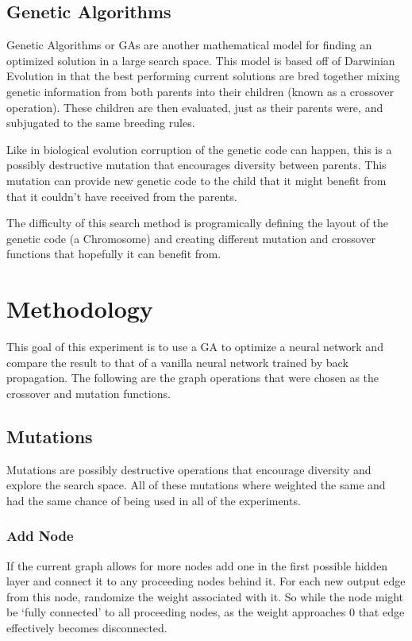 \documentclass[journal]{IEEEtran}
\begin{document}
  \subsection{Genetic Algorithms}
  Genetic Algorithms or GAs are another mathematical model for finding an optimized solution
  in a large search space. This model is based off of Darwinian Evolution in that the best performing
  current solutions are bred together mixing genetic information from both parents into their
  children (known as a crossover operation). These children are then evaluated, just as their
  parents were, and subjugated to the same breeding rules.

  Like in biological evolution corruption of the genetic code can happen, this is a possibly
  destructive mutation that encourages diversity between parents. This mutation can provide new
  genetic code to the child that it might benefit from that it couldn't have received from the parents.

  The difficulty of this search method is programically defining the layout of the genetic code
  (a Chromosome) and creating different mutation and crossover functions that hopefully it can benefit from.

\section{Methodology}
This goal of this experiment is to use a GA to optimize a neural network and compare the result
to that of a vanilla neural network trained by back propagation. The following are the graph
operations that were chosen as the crossover and mutation functions.
  \subsection{Mutations}
  Mutations are possibly destructive operations that encourage diversity and explore the search
  space. All of these mutations where weighted the same and had the same chance of being used
  in all of the experiments.
    \subsubsection{Add Node}
      If the current graph allows for more nodes add one in the first possible hidden layer and
      connect it to any proceeding nodes behind it. For each new output edge from this node,
      randomize the weight associated with it. So while the node might be `fully connected' to
      all proceeding nodes, as the weight approaches 0 that edge effectively becomes disconnected.
\end{document}
